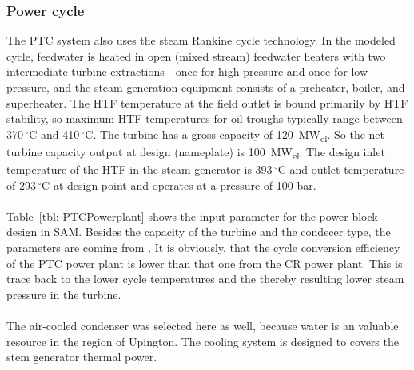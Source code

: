 \documentclass[Master,MEE,english]{twbook}%
\begin{document}
\subsubsection{Power cycle}
The PTC system also uses the steam Rankine cycle technology. In the modeled cycle, feedwater is heated in open (mixed stream) feedwater heaters with two intermediate turbine extractions - once for high pressure and once for low pressure, and the steam generation equipment consists of a preheater, boiler, and superheater. The HTF temperature at the field outlet is bound primarily by HTF stability, so maximum HTF temperatures for oil troughs typically range between 370$\,^{\circ}\mathrm{C}$ and 410$\,^{\circ}\mathrm{C}$. The turbine has a gross capacity of 120~MW\textsubscript{el}. So the net turbine capacity output at design (nameplate) is 100~MW\textsubscript{el}. The design inlet temperature of the HTF in the steam generator is 393$\,^{\circ}\mathrm{C}$ and outlet temperature of 293$\,^{\circ}\mathrm{C}$ at design point and operates at a pressure of 100 bar.\\
\\
Table~\ref{tbl: PTCPowerplant} shows the input parameter for the power block design in SAM. Besides the capacity of the turbine and the condecer type, the parameters are coming from \cite{Wagner2011}. It is obviously, that the cycle conversion efficiency of the PTC power plant is lower than that one from the CR power plant. This is trace back to the lower cycle temperatures and the thereby resulting lower steam pressure in the turbine.\\
\\
The air-cooled condenser was selected here as well, because water is an valuable resource in the region of Upington. The cooling system is designed to covers the stem generator thermal power. 
\end{document}
